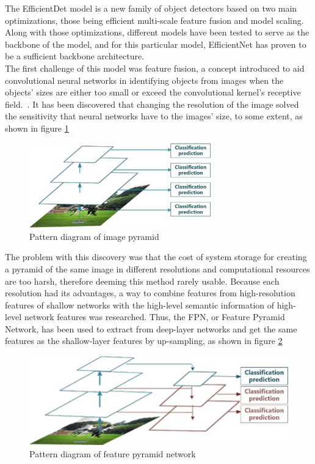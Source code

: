 The EfficientDet model is a new family of object detectors based on two main optimizations, those being efficient multi-scale feature fusion and model scaling. Along with those optimizations, different models have been tested to serve as the backbone of the model, and for this particular model, EfficientNet has proven to be a sufficient backbone architecture.~\cite{carte8}\\
The first challenge of this model was feature fusion, a concept introduced to aid convolutional neural networks in identifying objects from images when the objects' sizes are either too small or exceed the convolutional kernel's receptive field.~\cite{carte9}. It has been discovered that changing the resolution of the image solved the sensitivity that neural networks have to the images' size, to some extent, as shown in figure \ref{fig:fig4}\\
\begin{figure}[h!]
    \centering
    \includegraphics[width=0.7\textwidth]{figures/Figure4.png}
    \caption{Pattern diagram of image pyramid}
    \label{fig:fig4}
\end{figure}
The problem with this discovery was that the cost of system storage for creating a pyramid of the same image in different resolutions and computational resources are too harsh, therefore deeming this method rarely usable. Because each resolution had its advantages, a way to combine features from high-resolution features of shallow networks with the high-level semantic information of high-level network features was researched. Thus, the FPN, or Feature Pyramid Network, has been used to extract from deep-layer networks and get the same features as the shallow-layer features by up-sampling, as shown in figure \ref{fig:fig5}\\ 
\begin{figure}[h!]
    \centering
    \includegraphics[width=0.7\linewidth]{figures/Figure5.png}
    \caption{Pattern diagram of feature pyramid network}
    \label{fig:fig5}
\end{figure}
